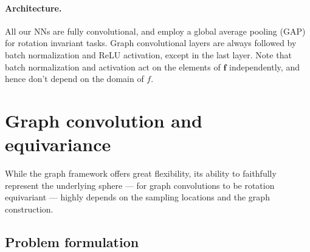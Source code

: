 \documentclass{article} %
\renewcommand{\b}[1]{{\bm{#1}}}  %
\newcommand{\nati}[1]{{\color[rgb]{.3,.5,.9}{#1}}}
\begin{document}
\paragraph{Architecture.}
All our NNs are fully convolutional, and employ a global average pooling (GAP) for rotation invariant tasks.
Graph convolutional layers are always followed by batch normalization and ReLU activation, except in the last layer.
Note that batch normalization and activation act on the elements of $\b{f}$ independently, and hence don't depend on the domain of $f$.


\section{Graph convolution and equivariance} \label{sec:equivariance}

While the graph framework offers great flexibility, its ability to faithfully represent the underlying sphere --- for graph convolutions to be rotation equivariant --- highly depends on the sampling locations and the graph construction.

\subsection{Problem formulation}
\end{document}
